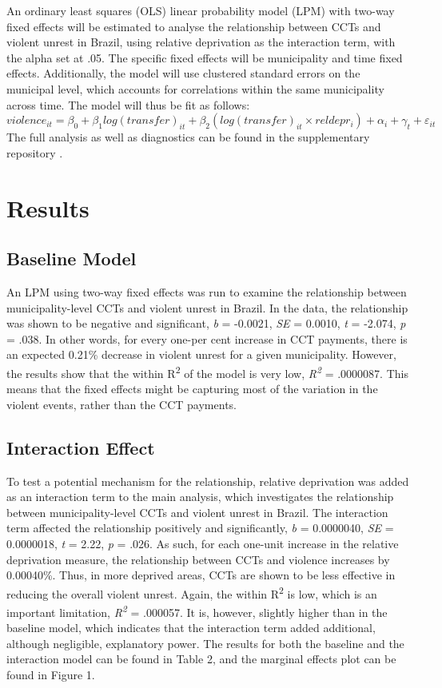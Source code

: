 \documentclass[stu,12pt]{apa7}
\begin{document}
An ordinary least squares (OLS) linear probability model (LPM) with two-way fixed effects will be estimated to analyse the relationship between CCTs and violent unrest in Brazil, using relative deprivation as the interaction term, with the alpha set at .05. The specific fixed effects will be municipality and time fixed effects. Additionally, the model will use clustered standard errors on the municipal level, which accounts for correlations within the same municipality across time. The model will thus be fit as follows:
\[violence_{it} = \beta_0 + \beta_1log(transfer)_{it} + \beta_2(log(transfer)_{it} \times reldepr_i) + \alpha_i + \gamma_t + \varepsilon_{it}\]
The full analysis as well as diagnostics can be found in the supplementary repository \parencite{zotero-item-1650}.

\section{Results}

\subsection{Baseline Model}

An LPM using two-way fixed effects was run to examine the relationship between municipality-level CCTs and violent unrest in Brazil. In the data, the relationship was shown to be negative and significant, \textit{b} = -0.0021, \textit{SE} = 0.0010, \textit{t} = -2.074, \textit{p} = .038. In other words, for every one-per cent increase in CCT payments, there is an expected 0.21\% decrease in violent unrest for a given municipality. However, the results show that the within R\textsuperscript{2} of the model is very low, \textit{R\textsuperscript{2}} = .0000087. This means that the fixed effects might be capturing most of the variation in the violent events, rather than the CCT payments.

\subsection{Interaction Effect}

To test a potential mechanism for the relationship, relative deprivation was added as an interaction term to the main analysis, which investigates the relationship between municipality-level CCTs and violent unrest in Brazil. The interaction term affected the relationship positively and significantly, \textit{b} = 0.0000040, \textit{SE} = 0.0000018, \textit{t} = 2.22, \textit{p} = .026. As such, for each one-unit increase in the relative deprivation measure, the relationship between CCTs and violence increases by 0.00040\%. Thus, in more deprived areas, CCTs are shown to be less effective in reducing the overall violent unrest. Again, the within R\textsuperscript{2} is low, which is an important limitation, \textit{R\textsuperscript{2}} = .000057. It is, however, slightly higher than in the baseline model, which indicates that the interaction term added additional, although negligible, explanatory power. The results for both the baseline and the interaction model can be found in Table 2, and the marginal effects plot can be found in Figure 1.
\end{document}
